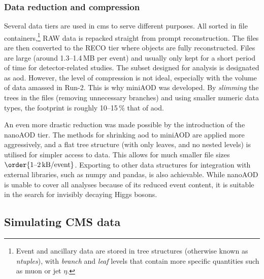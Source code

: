 




\subsubsection{Data reduction and compression}
\label{subsubsec:cms_data_tiers}

Several data tiers are used in \acrshort{cms} to serve different purposes. All sorted in \ROOT file containers,\footnote{Event and ancillary data are stored in tree structures (otherwise known as \emph{ntuples}), with \emph{branch} and \emph{leaf} levels that contain more specific quantities such as muon \pt or \gls{jet} $\eta$.} RAW data is repacked straight from prompt reconstruction. The files are then converted to the RECO tier where objects are fully reconstructed. Files are large (around 1.3--1.4\,MB per event) and usually only kept for a short period of time for detector-related studies. The subset designed for analysis is designated as \acrfull{aod}. However, the level of compression is not ideal, especially with the volume of data amassed in Run-2. This is why miniAOD was developed. By \emph{slimming} the trees in the files (removing unnecessary branches) and using smaller numeric data types, the footprint is roughly 10--15\,\% that of \acrshort{aod}.

An even more drastic reduction was made possible by the introduction of the nanoAOD tier. The methods for shrinking \acrshort{aod} to miniAOD are applied more aggressively, and a flat tree structure (with only leaves, and no nested levels) is utilised for simpler access to data. This allows for much smaller file sizes $\order{\text{1--2\,kB}/\text{event}}$. Exporting to other data structures for integration with external libraries, such as \textsf{numpy} and \textsf{pandas}, is also achievable. While nanoAOD is unable to cover all analyses because of its reduced event content, it is suitable in the search for invisibly decaying Higgs bosons.




\subsection{Simulating CMS data}
\label{subsec:cms_mc}

